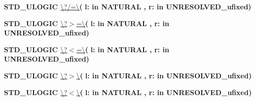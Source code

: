 \begin{DoxyCompactItemize}
\item 
{\bfseries {\bfseries \textcolor{comment}{S\+T\+D\+\_\+\+U\+L\+O\+G\+I\+C}\textcolor{vhdlchar}{ }}} \hyperlink{classfixed__pkg_a172a73302b09f0d298b93ecda8c5e976}{\textbackslash{}?/=\textbackslash{}}{\bfseries  ( }{\bfseries \textcolor{vhdlchar}{l\+: }\textcolor{stringliteral}{in }{\bfseries \textcolor{comment}{N\+A\+T\+U\+R\+A\+L}\textcolor{vhdlchar}{ }}}{\bfseries  , \textcolor{vhdlchar}{r\+: }\textcolor{stringliteral}{in }\textcolor{vhdlchar}{U\+N\+R\+E\+S\+O\+L\+V\+E\+D\+\_\+ufixed}}{\bfseries  )} 
\item 
{\bfseries {\bfseries \textcolor{comment}{S\+T\+D\+\_\+\+U\+L\+O\+G\+I\+C}\textcolor{vhdlchar}{ }}} \hyperlink{classfixed__pkg_a3adee8c12e5c0bb76fc3e1a493284a27}{\textbackslash{}?$>$=\textbackslash{}}{\bfseries  ( }{\bfseries \textcolor{vhdlchar}{l\+: }\textcolor{stringliteral}{in }{\bfseries \textcolor{comment}{N\+A\+T\+U\+R\+A\+L}\textcolor{vhdlchar}{ }}}{\bfseries  , \textcolor{vhdlchar}{r\+: }\textcolor{stringliteral}{in }\textcolor{vhdlchar}{U\+N\+R\+E\+S\+O\+L\+V\+E\+D\+\_\+ufixed}}{\bfseries  )} 
\item 
{\bfseries {\bfseries \textcolor{comment}{S\+T\+D\+\_\+\+U\+L\+O\+G\+I\+C}\textcolor{vhdlchar}{ }}} \hyperlink{classfixed__pkg_a271da29f659a2bc9480dbd29d7727913}{\textbackslash{}?$<$=\textbackslash{}}{\bfseries  ( }{\bfseries \textcolor{vhdlchar}{l\+: }\textcolor{stringliteral}{in }{\bfseries \textcolor{comment}{N\+A\+T\+U\+R\+A\+L}\textcolor{vhdlchar}{ }}}{\bfseries  , \textcolor{vhdlchar}{r\+: }\textcolor{stringliteral}{in }\textcolor{vhdlchar}{U\+N\+R\+E\+S\+O\+L\+V\+E\+D\+\_\+ufixed}}{\bfseries  )} 
\item 
{\bfseries {\bfseries \textcolor{comment}{S\+T\+D\+\_\+\+U\+L\+O\+G\+I\+C}\textcolor{vhdlchar}{ }}} \hyperlink{classfixed__pkg_a9e6b6b8c2c14da978e6f70cb6e85e6dc}{\textbackslash{}?$>$\textbackslash{}}{\bfseries  ( }{\bfseries \textcolor{vhdlchar}{l\+: }\textcolor{stringliteral}{in }{\bfseries \textcolor{comment}{N\+A\+T\+U\+R\+A\+L}\textcolor{vhdlchar}{ }}}{\bfseries  , \textcolor{vhdlchar}{r\+: }\textcolor{stringliteral}{in }\textcolor{vhdlchar}{U\+N\+R\+E\+S\+O\+L\+V\+E\+D\+\_\+ufixed}}{\bfseries  )} 
\item 
{\bfseries {\bfseries \textcolor{comment}{S\+T\+D\+\_\+\+U\+L\+O\+G\+I\+C}\textcolor{vhdlchar}{ }}} \hyperlink{classfixed__pkg_a7e98e66a4a282c529968f69f70dd16ad}{\textbackslash{}?$<$\textbackslash{}}{\bfseries  ( }{\bfseries \textcolor{vhdlchar}{l\+: }\textcolor{stringliteral}{in }{\bfseries \textcolor{comment}{N\+A\+T\+U\+R\+A\+L}\textcolor{vhdlchar}{ }}}{\bfseries  , \textcolor{vhdlchar}{r\+: }\textcolor{stringliteral}{in }\textcolor{vhdlchar}{U\+N\+R\+E\+S\+O\+L\+V\+E\+D\+\_\+ufixed}}{\bfseries  )} 

\end{DoxyCompactItemize}
